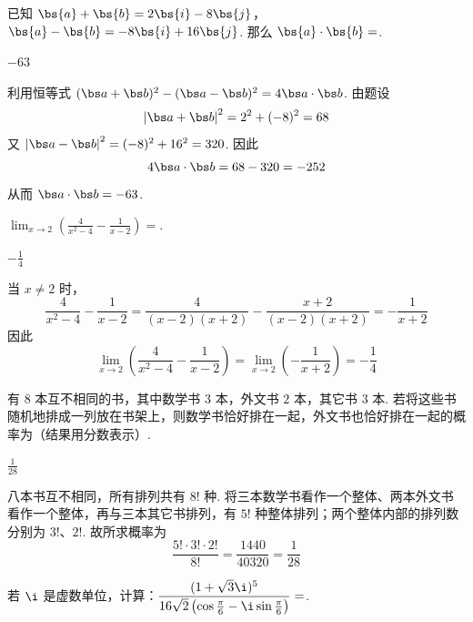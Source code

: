 \setcounter{probnum}{14}
\begin{problem}[B]
已知 \(\bs{a}+\bs{b}=2\bs{i}-8\bs{j}\)，\(\bs{a}-\bs{b}=-8\bs{i}+16\bs{j}\). 那么 \(\bs{a}\cdot\bs{b}=\)\fillinblank{}.
\end{problem}

\begin{answer}
\(-63\)
\end{answer}

\begin{solution}
利用恒等式 \((\bs a+\bs b)^2-(\bs a-\bs b)^2=4\bs a\cdot\bs b\). 由题设
\[
\left\lvert\bs a+\bs b\right\rvert^2=2^2+(-8)^2=68
\]
又 \(\left\lvert\bs a-\bs b\right\rvert^2=(-8)^2+16^2=320\).
因此
\[
4\bs a\cdot\bs b=68-320=-252
\]
从而 \(\bs a\cdot\bs b=-63\).
\end{solution}

\begin{problem}[B]
\(\displaystyle\lim_{x\to2}\left(\frac{4}{x^{2}-4}-\frac{1}{x-2}\right)=\)\fillinblank{}.
\end{problem}

\begin{answer}
\(-\frac{1}{4}\)
\end{answer}

\begin{solution}
当 \(x\neq2\) 时，
\[
\frac{4}{x^2-4}-\frac{1}{x-2}
=\frac{4}{(x-2)(x+2)}-\frac{x+2}{(x-2)(x+2)}
=-\frac{1}{x+2}
\]
因此
\[
\lim_{x\to2}\left(\frac{4}{x^2-4}-\frac{1}{x-2}\right)
=\lim_{x\to2}\left(-\frac{1}{x+2}\right)=-\frac14
\]
\end{solution}

\begin{problem}[B]
有 \(8\) 本互不相同的书，其中数学书 \(3\) 本，外文书 \(2\) 本，其它书 \(3\) 本. 若将这些书随机地排成一列放在书架上，则数学书恰好排在一起，外文书也恰好排在一起的概率为\fillinblank{}（结果用分数表示）.
\end{problem}

\begin{answer}
\(\frac{1}{28}\)
\end{answer}

\begin{solution}
八本书互不相同，所有排列共有 \(8!\) 种. 将三本数学书看作一个整体、两本外文书看作一个整体，再与三本其它书排列，有 \(5!\) 种整体排列；两个整体内部的排列数分别为 \(3!\)、\(2!\). 故所求概率为
\[
\frac{5!\cdot3!\cdot2!}{8!}=\frac{1440}{40320}=\frac{1}{28}
\]
\end{solution}

\begin{problem}[B]
若 \(\i\) 是虚数单位，计算：\(\displaystyle \frac{(1+\sqrt{3}\i)^5}{16\sqrt{2}\left(\cos\frac{\pi}{6}-\i\sin\frac{\pi}{6}\right)}=\)\fillinblank{}.
\end{problem}

